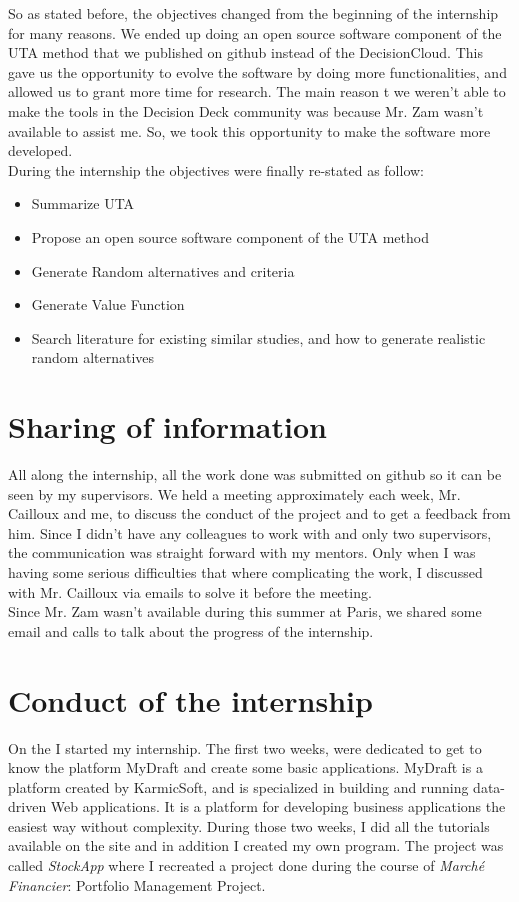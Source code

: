 \documentclass{report}
\begin{document}
So as stated before, the objectives changed from the beginning of the internship for many reasons. We ended up doing an open source software component of the UTA method that we published on github instead of the DecisionCloud. This gave us the opportunity to evolve the software by doing more functionalities, and allowed us to grant more time for research. The main reason t we weren't able to make the tools in the Decision Deck community was because Mr. Zam wasn't available to assist me. So, we took this opportunity to make the software more developed.\\
During the internship the objectives were finally re-stated as follow: 
\begin{itemize}
\item Summarize UTA
\item Propose an open source software component of the UTA method
\item Generate Random alternatives and criteria
\item Generate Value Function
\item Search literature for existing similar studies, and how to generate realistic random alternatives
\end{itemize}

\section{Sharing of information}
All along the internship, all the work done was submitted on github so it can be seen by my supervisors. We held a meeting approximately each week, Mr. Cailloux and me, to discuss the conduct of the project and to get a feedback from him. Since I didn't have any colleagues to work with and only two supervisors, the communication was straight forward with my mentors. Only when I was having some serious difficulties that where complicating the work, I discussed with Mr. Cailloux via emails to solve it before the meeting. \\
Since Mr. Zam wasn't available during this summer at Paris, we shared some email and calls to talk about the progress of the internship. 

\section{Conduct of the internship}
On the  I started my internship. The first two weeks, were dedicated to get to know the platform MyDraft and create some basic applications. MyDraft is a platform created by KarmicSoft, and is  specialized in building and running data-driven Web applications. It is a platform for developing business applications the easiest way without complexity. During those two weeks, I did all the tutorials available on the site and in addition I created my own program. The project was called \textit{StockApp} where I recreated a project done during the course of \textit{Marché Financier}: Portfolio Management Project.\\
\end{document}
